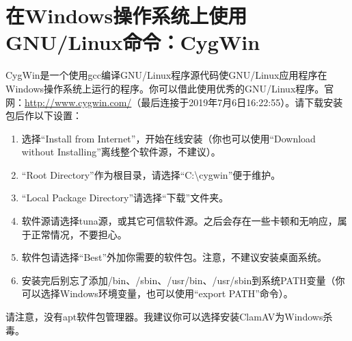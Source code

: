 \documentclass{book}
\begin{document}
\section{在Windows操作系统上使用GNU/Linux命令：CygWin}
CygWin是一个使用gcc编译GNU/Linux程序源代码使GNU/Linux应用程序在Windows操作系统上运行的程序。你可以借此使用优秀的GNU/Linux程序。官网：\url{http://www.cygwin.com/}（最后连接于2019年7月6日16:22:55）。请下载安装包后作以下设置：
\begin{enumerate}
\item 选择“Install from Internet”，开始在线安装（你也可以使用“Download without Installing”离线整个软件源，不建议）。
\item “Root Directory”作为根目录，请选择“C:\textbackslash cygwin”便于维护。
\item “Local Package Directory”请选择“下载”文件夹。
\item 软件源请选择tuna源，或其它可信软件源。之后会存在一些卡顿和无响应，属于正常情况，不要担心。
\item 软件包请选择“Best”外加你需要的软件包。注意，不建议安装桌面系统。
\item 安装完后别忘了添加/bin、/sbin、/usr/bin、/usr/sbin到系统PATH变量（你可以选择Windows环境变量，也可以使用“export PATH”命令）。 
\end{enumerate}
请注意，没有apt软件包管理器。我建议你可以选择安装ClamAV为Windows杀毒。
\end{document}
